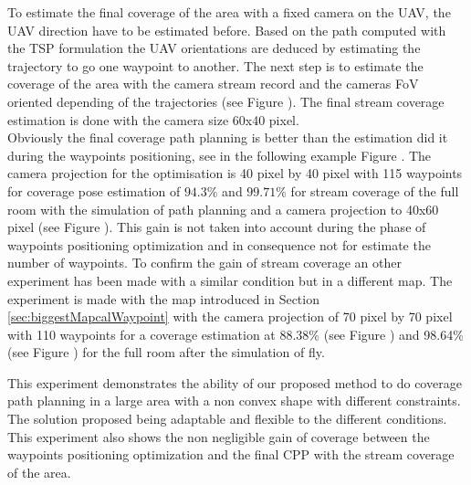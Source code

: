 To estimate the final coverage of the area with a fixed camera on the UAV, the UAV direction have to be estimated before. 
Based on the path computed with the TSP formulation the UAV orientations are deduced by estimating the trajectory to go one waypoint to another.
The next step is to estimate the coverage of the area with the camera stream  record and the cameras FoV oriented depending of the trajectories (see Figure ). The final stream coverage estimation is done with the camera size 60x40 pixel. \\
Obviously the final coverage path planning is better than the estimation did it during the waypoints positioning, see  in the following example Figure . The camera projection for the optimisation  is 40 pixel by 40 pixel with 115 waypoints for coverage pose estimation of $94.3\%$ and $99.71\%$ for stream coverage of the full room with the simulation of path planning and a camera projection to 40x60 pixel (see Figure ). This gain is not taken into account during the phase of waypoints positioning optimization and in consequence not for estimate the number of waypoints.%
To confirm the gain of stream coverage an other experiment has been made with a similar condition but in a different map. The experiment is made with the map introduced in Section \ref{sec:biggestMapcalWaypoint} with the camera projection of 70 pixel by 70 pixel with 110 waypoints for a coverage estimation at 88.38\%  (see Figure ) and 98.64\% (see Figure ) for the full room after the simulation of fly.

This experiment demonstrates the ability of our proposed method to do coverage path planning in a large area with a non convex shape with different constraints. The solution proposed being adaptable and flexible to the different conditions. This experiment also shows the non negligible gain of coverage between the waypoints positioning optimization and the final CPP with the stream coverage of the area.




